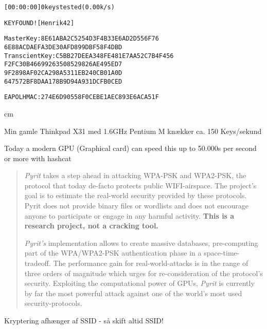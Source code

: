 \documentclass[Screen16to9,17pt]{foils}
\begin{document}

\begin{alltt}
\small
          [00:00:00] 0 keys tested (0.00 k/s)

                    KEY FOUND! [ Henrik42 ]

Master Key     : 8E 61 AB A2 C5 25 4D 3F 4B 33 E6 AD 2D 55 6F 76
                 6E 88 AC DA EF A3 DE 30 AF D8 99 DB F5 8F 4D BD
Transcient Key : C5 BB 27 DE EA 34 8F E4 81 E7 AA 52 C7 B4 F4 56
                 F2 FC 30 B4 66 99 26 35 08 52 98 26 AE 49 5E D7
                 9F 28 98 AF 02 CA 29 8A 53 11 EB 24 0C B0 1A 0D
                 64 75 72 BF 8D AA 17 8B 9D 94 A9 31 DC FB 0C ED

EAPOL HMAC     : 27 4E 6D 90 55 8F 0C EB E1 AE C8 93 E6 AC A5 1F

\end{alltt}

 cm

\centerline{Min gamle Thinkpad X31 med 1.6GHz Pentium M knækker ca. 150 Keys/sekund}

Today a modern GPU (Graphical card) can speed this up to 50.000s per second or more with hashcat




\begin{quote}
\emph{Pyrit} takes a step ahead in attacking WPA-PSK and WPA2-PSK, the protocol that today de-facto protects public WIFI-airspace. The project's goal is to estimate the real-world security provided by these protocols. Pyrit does not provide binary files or wordlists and does not encourage anyone to participate or engage in any harmful activity. {\bf This is a research project, not a cracking tool.}

\emph{Pyrit's} implementation allows to create massive databases, pre-computing part of the WPA/WPA2-PSK authentication phase in a space-time-tradeoff. The performance gain for real-world-attacks is in the range of three orders of magnitude which urges for re-consideration of the protocol's security. Exploiting the computational power of GPUs, \emph{Pyrit} is currently by far the most powerful attack against one of the world's most used security-protocols.
\end{quote}

\begin{list1}
\item Kryptering afhænger af SSID - så skift altid SSID!
\item {}
\end{list1}
\end{document}
